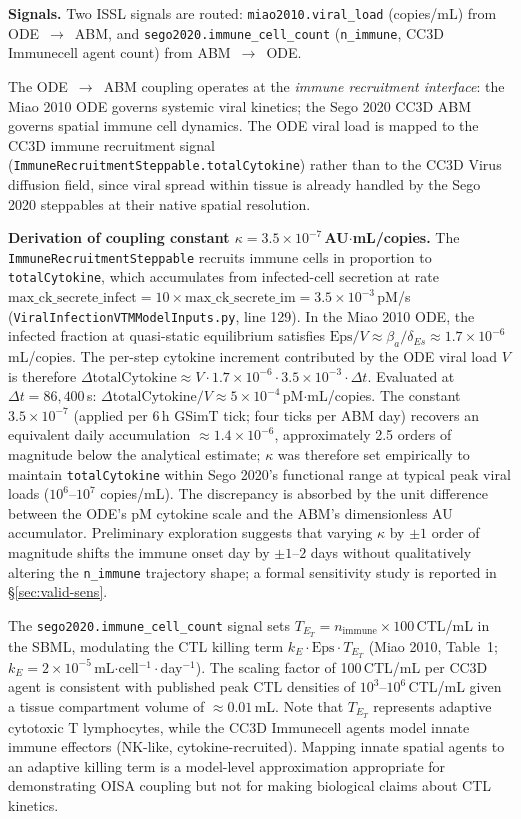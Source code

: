 \documentclass[conference,letterpaper,10pt]{IEEEtran}
\begin{document}
\textbf{Signals.} Two ISSL signals are routed:
\texttt{miao2010.viral\_load} (copies/mL) from ODE~$\to$~ABM, and
\texttt{sego2020.immune\_cell\_count} (\texttt{n\_immune}, CC3D
Immunecell agent count) from ABM~$\to$~ODE.

The ODE~$\to$~ABM coupling operates at the \emph{immune recruitment
interface}: the Miao 2010 ODE governs systemic viral kinetics; the Sego
2020 CC3D ABM governs spatial immune cell dynamics. The ODE viral load
is mapped to the CC3D immune recruitment signal
(\texttt{ImmuneRecruitmentSteppable.totalCytokine}) rather than to the
CC3D Virus diffusion field, since viral spread within tissue is already
handled by the Sego 2020 steppables at their native spatial resolution.

\textbf{Derivation of coupling constant
$\kappa = 3.5{\times}10^{-7}$\,AU$\cdot$mL/copies.} The
\texttt{ImmuneRecruitmentSteppable} recruits immune cells in proportion
to \texttt{totalCytokine}, which accumulates from infected-cell
secretion at rate
$\text{max\_ck\_secrete\_infect}=10\!\times\!\text{max\_ck\_secrete\_im}=3.5{\times}10^{-3}$\,pM/s
(\texttt{ViralInfectionVTMModelInputs.py}, line 129). In the Miao 2010
ODE, the infected fraction at quasi-static equilibrium satisfies
$\mathrm{Eps}/V \approx \beta_a/\delta_{Es} \approx 1.7{\times}10^{-6}$\,mL/copies.
The per-step cytokine increment contributed by the ODE viral load $V$
is therefore
$\Delta\mathrm{totalCytokine} \approx V \cdot 1.7{\times}10^{-6} \cdot 3.5{\times}10^{-3} \cdot \Delta t$.
Evaluated at $\Delta t=86{,}400$\,s:
$\Delta\mathrm{totalCytokine}/V \approx 5{\times}10^{-4}$\,pM$\cdot$mL/copies.
The constant $3.5{\times}10^{-7}$ (applied per 6\,h GSimT tick; four
ticks per ABM day) recovers an equivalent daily accumulation
$\approx 1.4{\times}10^{-6}$, approximately 2.5 orders of magnitude
below the analytical estimate; $\kappa$ was therefore set empirically
to maintain \texttt{totalCytokine} within Sego 2020's functional range
at typical peak viral loads ($10^{6}$--$10^{7}$ copies/mL). The
discrepancy is absorbed by the unit difference between the ODE's pM
cytokine scale and the ABM's dimensionless AU accumulator. Preliminary
exploration suggests that varying $\kappa$ by $\pm 1$ order of
magnitude shifts the immune onset day by $\pm 1$--$2$ days without
qualitatively altering the \texttt{n\_immune} trajectory shape; a
formal sensitivity study is reported in \S\ref{sec:valid-sens}.

The \texttt{sego2020.immune\_cell\_count} signal sets
$T_{E_T} = n_{\text{immune}} \times 100$\,CTL/mL in the SBML,
modulating the CTL killing term
$k_E \cdot \mathrm{Eps} \cdot T_{E_T}$ (Miao 2010, Table~1;
$k_E = 2{\times}10^{-5}$\,mL$\cdot$cell$^{-1}\cdot$day$^{-1}$). The
scaling factor of 100\,CTL/mL per CC3D agent is consistent with
published peak CTL densities of $10^{3}$--$10^{6}$\,CTL/mL given a
tissue compartment volume of $\approx 0.01$\,mL. Note that $T_{E_T}$
represents adaptive cytotoxic T lymphocytes, while the CC3D Immunecell
agents model innate immune effectors (NK-like, cytokine-recruited).
Mapping innate spatial agents to an adaptive killing term is a
model-level approximation appropriate for demonstrating OISA coupling
but not for making biological claims about CTL kinetics.
\end{document}

